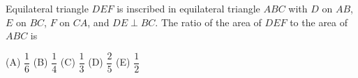 Equilateral triangle $DEF$ is inscribed in equilateral triangle $ABC$ with $D$ on $AB$, $E$ on $BC$, $F$ on $CA$, and $DE\perp BC$. The ratio of the area of $DEF$ to the area of $ABC$ is

(A) $\dfrac{1}{6}$ \quad (B) $\dfrac{1}{4}$ \quad (C) $\dfrac{1}{3}$ \quad (D) $\dfrac{2}{5}$ \quad (E) $\dfrac{1}{2}$
